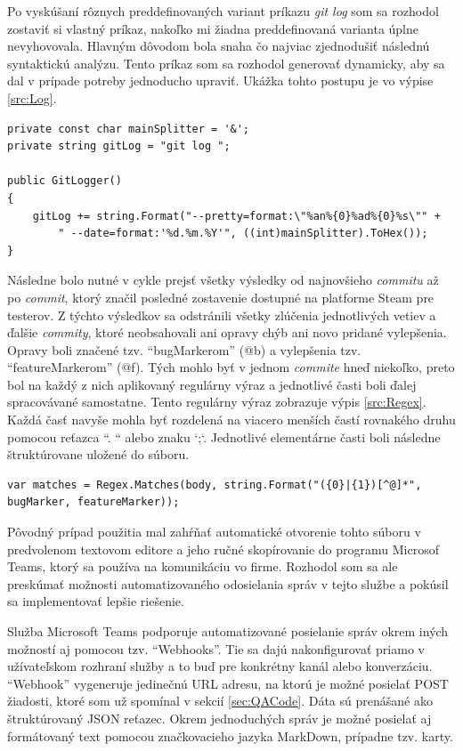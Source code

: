 \documentclass[slovak, bachelorpractice]{diploma}
\begin{document}
Po vyskúšaní rôznych preddefinovaných variant príkazu \textit{git log} som sa rozhodol zostaviť si vlastný príkaz, nakoľko mi žiadna preddefinovaná varianta úplne nevyhovovala. Hlavným dôvodom bola snaha čo najviac zjednodušiť následnú syntaktickú analýzu. Tento príkaz som sa rozhodol generovať dynamicky, aby sa dal v prípade potreby jednoducho upraviť. Ukážka tohto postupu je vo výpise \ref{src:Log}.
\vspace{10pt}
\begin{lstlisting}[label=src:Log,caption={Generovanie vlastného príkazu git log}]
private const char mainSplitter = '&';
private string gitLog = "git log ";

public GitLogger()
{
    gitLog += string.Format("--pretty=format:\"%an%{0}%ad%{0}%s\"" +
        " --date=format:'%d.%m.%Y'", ((int)mainSplitter).ToHex());
}
\end{lstlisting}

Následne bolo nutné v cykle prejsť všetky výsledky od najnovšieho \textit{commitu} až po \textit{commit}, ktorý značil posledné zostavenie dostupné na platforme Steam pre testerov. Z týchto výsledkov sa odstránili všetky zlúčenia jednotlivých vetiev a ďalšie  \textit{commity}, ktoré neobsahovali ani opravy chýb ani novo pridané vylepšenia. Opravy boli značené tzv. \enquote{bugMarkerom} (@b) a vylepšenia tzv. \enquote{featureMarkerom} (@f). Tých mohlo byť v jednom \textit{commite} hneď niekoľko, preto bol na každý z nich aplikovaný regulárny výraz a jednotlivé časti boli ďalej spracovávané samostatne. Tento regulárny výraz zobrazuje výpis \ref{src:Regex}. Každá časť navyše mohla byť rozdelená na viacero menších častí rovnakého druhu pomocou reťazca ``. `` alebo znaku `;`. Jednotlivé elementárne časti boli následne štruktúrovane uložené do súboru.
\vspace{10pt}
\begin{lstlisting}[label=src:Regex,caption={Regulárny výraz na rozdelenie tela \textit{commitu}}]
var matches = Regex.Matches(body, string.Format("({0}|{1})[^@]*", bugMarker, featureMarker));
\end{lstlisting}

Pôvodný prípad použitia mal zahŕňať automatické otvorenie tohto súboru v predvolenom textovom editore a jeho ručné skopírovanie do programu Microsof Teams, ktorý sa používa na komunikáciu vo firme. Rozhodol som sa ale preskúmať možnosti automatizovaného odosielania správ v tejto službe a pokúsil sa implementovať lepšie riešenie.

Služba Microsoft Teams podporuje automatizované posielanie správ okrem iných možností aj pomocou tzv. \enquote{Webhooks}. Tie sa dajú nakonfigurovať priamo v užívateľskom rozhraní služby a to buď pre konkrétny kanál alebo konverzáciu. \enquote{Webhook} vygeneruje jedinečnú URL adresu, na ktorú je možné posielať POST žiadosti, ktoré som už spomínal v sekcií \ref{sec:QACode}. Dáta sú prenášané ako štruktúrovaný JSON reťazec. Okrem jednoduchých správ je možné posielať aj formátovaný text pomocou značkovacieho jazyka MarkDown, prípadne tzv. karty. 
\end{document}
